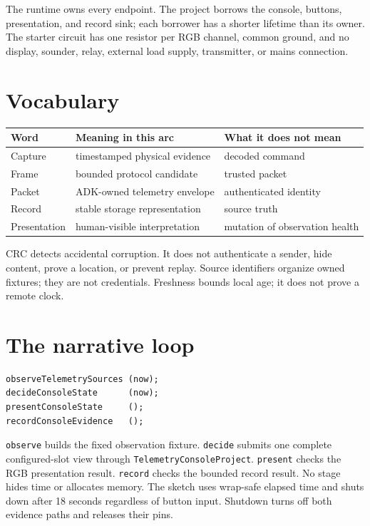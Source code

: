 \documentclass[11pt]{article}
\begin{document}
The runtime owns every endpoint. The project borrows the console, buttons,
presentation, and record sink; each borrower has a shorter lifetime than its
owner. The starter circuit has one resistor per RGB channel, common ground, and
no display, sounder, relay, external load supply, transmitter, or mains
connection.

\section{Vocabulary}

\begin{tabularx}{\linewidth}{@{}l X X@{}}
\toprule
Word & Meaning in this arc & What it does not mean\\
\midrule
Capture & timestamped physical evidence & decoded command\\
Frame & bounded protocol candidate & trusted packet\\
Packet & ADK-owned telemetry envelope & authenticated identity\\
Record & stable storage representation & source truth\\
Presentation & human-visible interpretation & mutation of observation health\\
\bottomrule
\end{tabularx}

CRC detects accidental corruption. It does not authenticate a sender, hide
content, prove a location, or prevent replay. Source identifiers organize owned
fixtures; they are not credentials. Freshness bounds local age; it does not
prove a remote clock.

\section{The narrative loop}

\begin{lstlisting}[style=adkcpp]
observeTelemetrySources (now);
decideConsoleState      (now);
presentConsoleState     ();
recordConsoleEvidence   ();
\end{lstlisting}

\texttt{observe} builds the fixed observation fixture. \texttt{decide} submits
one complete configured-slot view through \texttt{TelemetryConsoleProject}.
\texttt{present} checks the RGB presentation result. \texttt{record} checks
the bounded record result. No stage hides time or allocates memory. The sketch
uses wrap-safe elapsed time and shuts down after 18 seconds regardless of
button input. Shutdown turns off both evidence paths and releases their pins.
\end{document}
